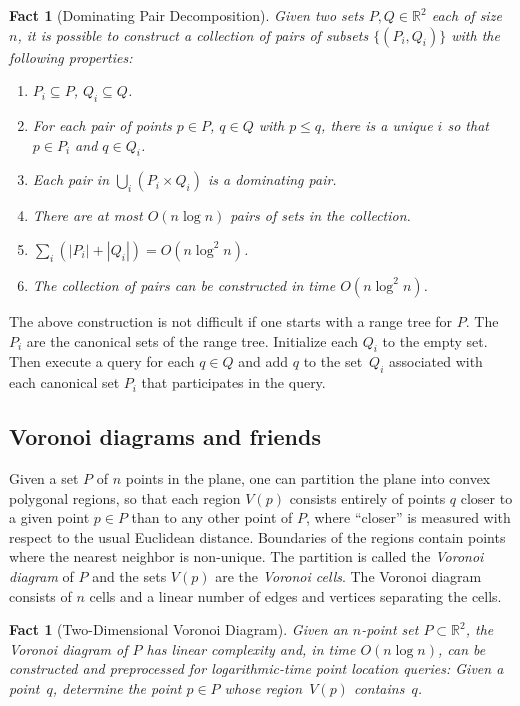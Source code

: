 \documentclass[11pt]{article}
\newtheorem{fact}[theorem]{Fact}
\theoremstyle{remark}
\def\RR{\mathbb{R}}
\begin{document}
\begin{fact}[Dominating Pair Decomposition]
  \label{fact:pairs-decomposition}
  Given two sets $P, Q \in \RR^2$ each of size $n$, it is possible to
  construct a collection of pairs of subsets $\{(P_i,Q_i)\}$ with the
  following properties:
  \begin{enumerate}
  \item $P_i \subseteq P$, $Q_i \subseteq Q$.
  \item For each pair of points $p \in P$, $q \in Q$ with $p \leq q$,
    there is a unique $i$ so that $p \in P_i$ and $q \in Q_i$.
  \item Each pair in $\bigcup_i (P_i \times Q_i)$ is a dominating pair.
  \item There are at most $O(n\log n)$ pairs of sets in the collection.
  \item $\sum_i (|P_i|+|Q_i|) = O(n \log^2 n)$.
  \item The collection of pairs can be constructed in time $O(n \log^2 n)$.
  \end{enumerate}
\end{fact}

The above construction is not difficult if one starts with a range tree for $P$. The $P_i$ are the canonical sets of the range tree.  Initialize each $Q_i$ to the empty set.   Then execute a query for each $q \in Q$ and add $q$ to the set~$Q_i$ associated with each canonical set $P_i$ that participates in the query.





\subsection{Voronoi diagrams and friends}
\label{sec:voronoi}

Given a set $P$ of $n$ points in the plane, one can partition the
plane into convex polygonal regions, so that each region $V(p)$
consists entirely of points $q$ closer to a given point $p \in P$ than
to any other point of $P$, where ``closer'' is measured with respect to the usual Euclidean distance.  Boundaries of the regions contain points
where the nearest neighbor is non-unique.  The partition is called the
\emph{Voronoi diagram} of $P$ and the sets $V(p)$ are the \emph{Voronoi
cells}.  The Voronoi diagram consists of $n$ cells and a linear number
of edges and vertices separating the cells.



\begin{fact}[Two-Dimensional Voronoi Diagram]
  \label{fact:vor-2d}
  Given an $n$-point set $P \subset \RR^2$, the Voronoi diagram of $P$
  has linear complexity and, in time $O(n \log n)$, can be constructed 
  and preprocessed for logarithmic-time \emph{point location} queries:
  Given a point~$q$, determine the point $p \in P$ whose region~$V(p)$ contains~$q$.
\end{fact}
\end{document}
